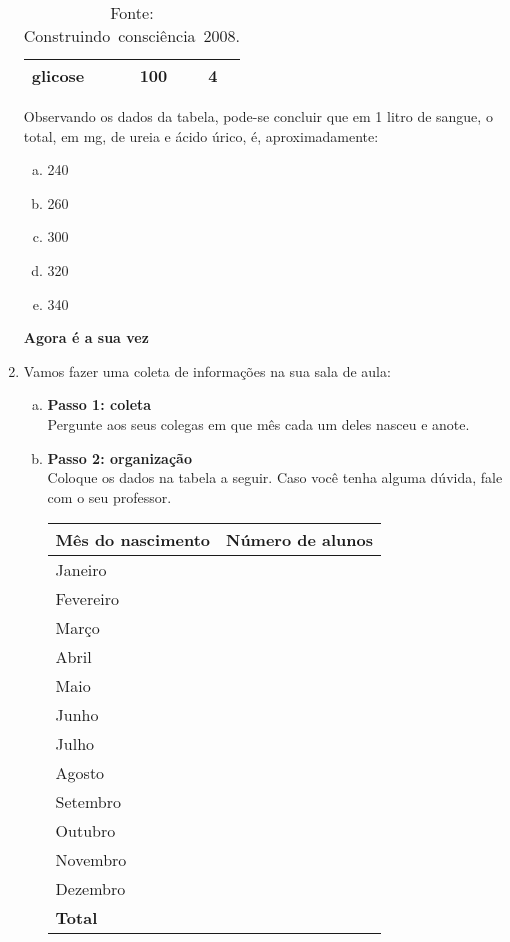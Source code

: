 \documentclass[a4paper,14pt]{article}
\begin{document}
\begin{multicols}{2}
\begin{enumerate}
\begin{table}[H]
\begin{tabular}{|p{2.8cm}|p{2.2cm}|p{2.2cm}|}
					glicose & 100 & 4 \\ \hline
				\end{tabular}
				\caption*{Fonte: Construindo~consciência~2008.}
			\end{table}
			Observando os dados da tabela, pode-se concluir que em 1 litro de sangue, o total, em mg, de ureia e ácido úrico, é, aproximadamente:
			\begin{enumerate}[a)]
				\item 240
				\item 260
				\item 300
				\item 320
				\item 340
			\end{enumerate}
			\textbf{Agora é a sua vez}
			\\
			\item Vamos fazer uma coleta de informações na sua sala de aula:
			\begin{enumerate}[a)]
				\item \textbf{Passo 1: coleta} \\
				Pergunte aos seus colegas em que mês cada um deles nasceu e anote. \newpage
				\item \textbf{Passo 2: organização} \\
				Coloque os dados na tabela a seguir. Caso você tenha alguma dúvida, fale com o seu professor.
					\begin{table}[H]
					\begin{tabular}{|p{3.5cm}|p{3.5cm}|}
						\hline
						\textbf{Mês do nascimento} & \textbf{Número de alunos}  \\ \hline
						Janeiro & ~~  \\ \hline
						Fevereiro & ~~ \\ \hline
						Março & ~~ \\ \hline
						Abril & ~~ \\ \hline
						Maio & ~~  \\ \hline
						Junho & ~~  \\ \hline
						Julho & ~~  \\ \hline
						Agosto & ~~  \\ \hline
						Setembro & ~~  \\ \hline
						Outubro & ~~  \\ \hline
						Novembro & ~~  \\ \hline
						Dezembro & ~~  \\ \hline
						\textbf{Total} & ~~  \\ \hline

\end{tabular}
\end{table}
\end{enumerate}
\end{enumerate}
\end{multicols}
\end{document}
